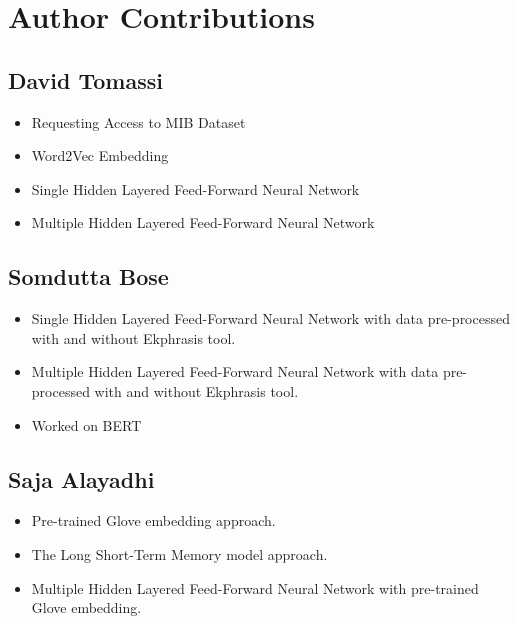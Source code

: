 \section{Author Contributions}
\label{sec:author-contributions}

\subsection{David Tomassi}
\begin{itemize}
    \item Requesting Access to MIB Dataset
    \item Word2Vec Embedding
    \item Single Hidden Layered Feed-Forward Neural Network
    \item Multiple Hidden Layered Feed-Forward Neural Network
\end{itemize}

\subsection{Somdutta Bose}
\begin{itemize}
    \item Single Hidden Layered Feed-Forward Neural Network with data pre-processed with and without Ekphrasis tool.
    \item Multiple Hidden Layered Feed-Forward Neural Network with data pre-processed with and without Ekphrasis tool.
    \item Worked on BERT
\end{itemize}
\subsection{Saja Alayadhi}
\begin{itemize}
    \item Pre-trained Glove embedding approach.
    \item The Long Short-Term Memory model approach.
     \item Multiple Hidden Layered Feed-Forward Neural Network with pre-trained Glove embedding.
\end{itemize}